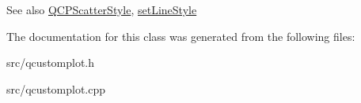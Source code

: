\begin{DoxySeeAlso}{See also}
\hyperlink{classQCPScatterStyle}{Q\+C\+P\+Scatter\+Style}, \hyperlink{classQCPGraph_a513fecccff5b2a50ce53f665338c60ff}{set\+Line\+Style} 
\end{DoxySeeAlso}


The documentation for this class was generated from the following files\+:\begin{DoxyCompactItemize}
\item 
src/qcustomplot.\+h\item 
src/qcustomplot.\+cpp\end{DoxyCompactItemize}
